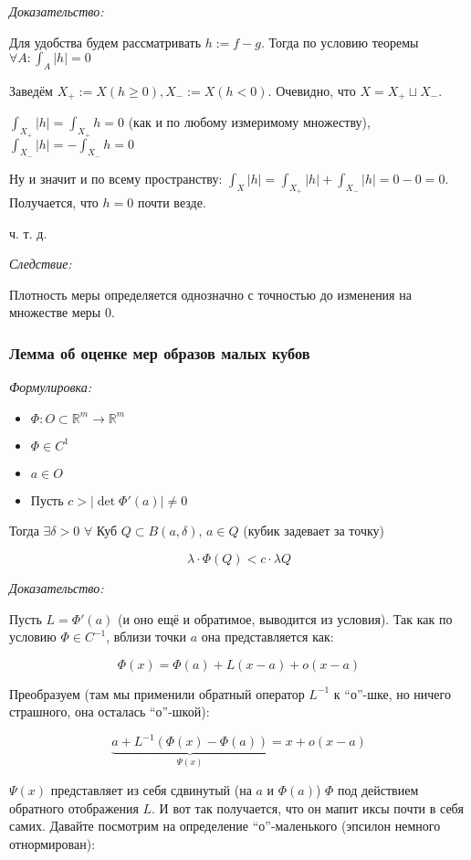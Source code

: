 \documentclass{article}
\def\dbl{\,\,}
\begin{document}
\textit{Доказательство:}

Для удобства будем рассматривать $h := f - g$. Тогда по условию теоремы $\forall A: \int_{A} |h| = 0$

Заведём $X_+ := X(h \ge 0), X_- := X(h < 0)$. Очевидно, что $X = X_+ \sqcup X_-$.

$\int_{X_+} |h| = \int_{X_+} h = 0$ (как и по любому измеримому множеству), $\int_{X_-} |h| = -\int_{X_-} h = 0$

Ну и значит и по всему пространству: $\int_{X} |h| = \int_{X_+} |h| + \int_{X_-} |h| = 0 - 0 = 0$. Получается, что $h = 0$ почти везде.

ч. т. д.

\textit{Следствие: }

Плотность меры определяется однозначно с точностью до изменения на множестве меры 0.

\subsubsection{Лемма об оценке мер образов малых кубов}
\textit{Формулировка:}

\begin{itemize}
    \item $\Phi: O \subset \mathbb{R}^{m} \rightarrow \mathbb{R}^{m}$
    \item $\Phi \in C^{1}$
    \item $a \in O$
    \item Пусть $c > |\det \Phi'(a)| \neq 0$
\end{itemize}

Тогда $\exists \delta > 0 \dbl \forall$ Куб $Q \subset B(a, \delta)$, $a \in Q$ (кубик задевает за точку)

\[\lambda \cdot \Phi(Q) < c \cdot \lambda Q\]

\textit{Доказательство:}

Пусть $L = \Phi'(a)$ (и оно ещё и обратимое, выводится из условия). Так как по условию $\Phi \in C^{-1}$, вблизи точки $a$ она представляется как:

\[\Phi(x) = \Phi(a) + L (x - a) + o(x - a)\]

Преобразуем (там мы применили обратный оператор $L^{-1}$ к ``о''-шке, но ничего страшного, она осталась ``о''-шкой):

\[\underbrace{a + L^{-1}(\Phi(x) - \Phi(a))}_{\Psi(x)} = x + o(x - a)\]

$\Psi(x)$ представляет из себя сдвинутый (на $a$ и $\Phi(a)$) $\Phi$ под действием обратного отображения $L$. И вот так получается, что он мапит иксы почти в себя самих. Давайте посмотрим на определение ``о''-маленького (эпсилон немного отнормирован):
\end{document}
